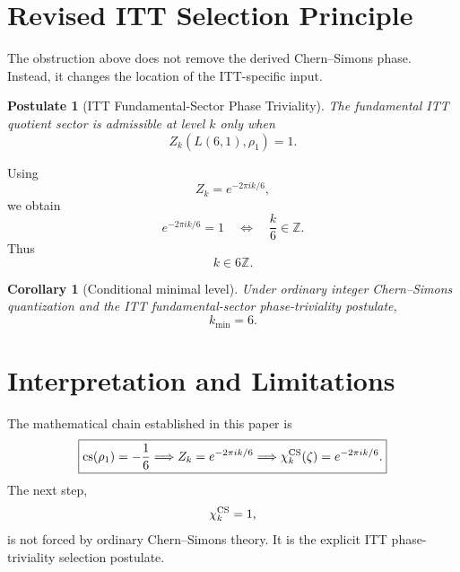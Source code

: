 \documentclass[11pt,a4paper]{article}
\newtheorem{corollary}[definition]{Corollary}
\newtheorem{postulate}[definition]{Postulate}
\begin{document}
\section{Revised ITT Selection Principle}

The obstruction above does not remove the derived Chern--Simons phase. Instead, it changes the location of the ITT-specific input.

\begin{postulate}[ITT Fundamental-Sector Phase Triviality]
The fundamental ITT quotient sector is admissible at level $k$ only when
\begin{equation}
\boxed{
Z_k(L(6,1),\rho_1)=1.
}
\end{equation}
\end{postulate}

Using
\begin{equation}
Z_k=e^{-2\pi i k/6},
\end{equation}
we obtain
\begin{equation}
e^{-2\pi i k/6}=1
\quad\Longleftrightarrow\quad
\frac{k}{6}\in\mathbb Z.
\end{equation}
Thus
\begin{equation}
\boxed{k\in6\mathbb Z.}
\end{equation}

\begin{corollary}[Conditional minimal level]
Under ordinary integer Chern--Simons quantization and the ITT fundamental-sector phase-triviality postulate,
\begin{equation}
\boxed{k_{\min}=6.}
\end{equation}
\end{corollary}

\section{Interpretation and Limitations}

The mathematical chain established in this paper is
\begin{equation}
\boxed{
\mathrm{cs}(\rho_1)=-\frac16
\Longrightarrow
Z_k=e^{-2\pi i k/6}
\Longrightarrow
\chi_k^{\rm CS}(\zeta)=e^{-2\pi i k/6}.
}
\end{equation}
The next step,
\begin{equation}
\chi_k^{\rm CS}=1,
\end{equation}
is not forced by ordinary Chern--Simons theory. It is the explicit ITT phase-triviality selection postulate.
\end{document}
